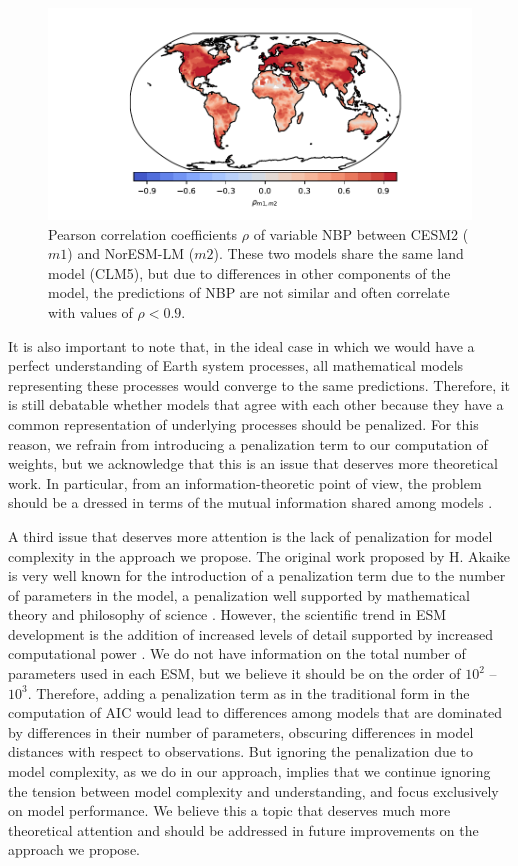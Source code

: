 \documentclass[gmd, manuscript]{copernicus}
\begin{document}
\begin{figure}[t]
   \centering
   \includegraphics[width=14cm]{Figures/Corr_CESM_NorESM.pdf} %
   \caption{Pearson correlation coefficients $\rho$ of variable NBP between CESM2 ($m1$) and NorESM-LM ($m2$). These two models share the same land model (CLM5), but due to differences in other components of the model, the predictions of NBP are not similar and often correlate with values of $\rho < 0.9$.}
   \label{fig:corr}
\end{figure}


It is also important to note that, in the ideal case in which we would have a perfect understanding of Earth system processes, all mathematical models representing these processes would converge to the same predictions. Therefore, it is still debatable whether models that agree with each other because they have a common representation of underlying processes should be penalized. For this reason, we refrain from introducing a penalization term to our computation of weights, but we acknowledge that this is an issue that deserves more theoretical work. In particular, from an information-theoretic point of view, the problem should be a dressed in terms of the mutual information shared among models \citep{Majhi2023}. 

A third issue that deserves more attention is the lack of penalization for model complexity in the approach we propose. The original work proposed by H. Akaike is very well known for the introduction of a penalization term due to the number of parameters in the model, a penalization well supported by mathematical theory and philosophy of science \citep{Akaike1974, Akaike1981}. However, the scientific trend in ESM development is the addition of increased levels of detail supported by increased computational power \citep{Held2005, Held2014}. We do not have information on the total number of parameters used in each ESM, but we believe it should be on the order of $10^2$ -- $10^3$. Therefore, adding a penalization term as in the traditional form in the computation of AIC would lead to differences among models that are dominated by differences in their number of parameters, obscuring differences in model distances with respect to observations. But ignoring the penalization due to model complexity, as we do in our approach, implies that we continue ignoring the tension between model complexity and understanding, and focus exclusively on model performance. We believe this a topic that deserves much more theoretical attention and should be addressed in future improvements on the approach we propose. 
\end{document}
